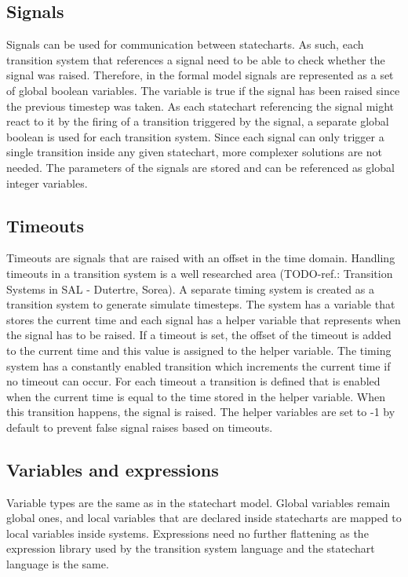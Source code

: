   \subsection{Signals}
Signals can be used for communication between statecharts. As such, each transition system that references a signal need to be able to check whether the signal was raised. Therefore, in the formal model signals are represented as a set of global boolean variables. The variable is true if the signal has been raised since the previous timestep was taken. As each statechart referencing the signal might react to it by the firing of a transition triggered by the signal, a separate global boolean is used for each transition system. Since each signal can only trigger a single transition inside any given statechart, more complexer solutions are not needed. The parameters of the signals are stored and can be referenced as global integer variables.
  \subsection{Timeouts}
Timeouts are signals that are raised with an offset in the time domain. Handling timeouts in a transition system is a well researched area (TODO-ref.: Transition Systems in SAL - Dutertre, Sorea). A separate timing system is created as a transition system to generate simulate timesteps. The system has a variable that stores the current time and each signal has a helper variable that represents when the signal has to be raised. If a timeout is set, the offset of the timeout is added to the current time and this value is assigned to the helper variable. The timing system has a constantly enabled transition which increments the current time if no timeout can occur. For each timeout a transition is defined that is enabled when the current time is equal to the time stored in the helper variable. When this transition happens, the signal is raised. The helper variables are set to -1 by default to prevent false signal raises based on timeouts.
  \subsection{Variables and expressions}
Variable types are the same as in the statechart model. Global variables remain global ones, and local variables that are declared inside statecharts are mapped to local variables inside systems. Expressions need no further flattening as the expression library used by the transition system language and the statechart language is the same.
